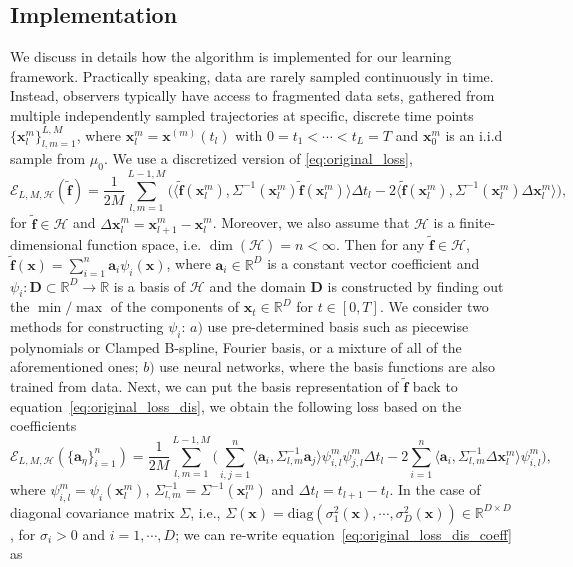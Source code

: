 \documentclass[11pt]{article} %
\def\eqref#1{equation~\ref{#1}}
\def\rvx{{\mathbf{x}}}
\def\va{{\bm{a}}}
\def\vf{{\bm{f}}}
\def\vx{{\bm{x}}}
\def\mD{{\bm{D}}}
\def\gH{{\mathcal{H}}}
\newcommand{\R}{\mathbb{R}}
\newcommand{\loss}{\mathcal{E}}
\DeclareMathOperator{\Dim}{dim}
\begin{document}
\subsection{Implementation}\label{subsec: Implementation}
%
We discuss in details how the algorithm is implemented for our learning framework. Practically speaking, data are rarely sampled continuously in time. Instead, observers typically have access to fragmented data sets, gathered from multiple independently sampled trajectories at specific, discrete time points$\{\rvx_l^m\}_{l, m = 1}^{L, M}$, where $\rvx_l^m = \rvx^{(m)}(t_l)$ with $0 = t_1 < \cdots < t_L = T$ and $\rvx_0^m$ is an i.i.d sample from $\mu_0$.  
We use a discretized version of \ref{eq:original_loss}, 
\begin{equation}\label{eq:original_loss_dis}
\loss_{L, M, \gH}(\tilde\vf) = \frac{1}{2M}\sum_{l, m = 1}^{L - 1, M}
\Big(\langle\tilde\vf(\rvx_l^m), \Sigma^{-1}(\rvx_l^m)\tilde\vf(\rvx_l^m)\rangle\Delta t_l  - 2\langle\tilde\vf(\rvx_l^m), \Sigma^{-1}(\rvx_l^m)\Delta\rvx_l^m\rangle\Big),
\end{equation}
for $\tilde\vf \in \gH$ and $\Delta\rvx_l^m = \rvx_{l + 1}^m - \rvx_l^m$.  Moreover, we also assume that $\gH$ is a finite-dimensional function space, i.e. $\Dim(\gH) = n < \infty$.  Then for any $\tilde\vf \in \gH$, $\tilde\vf(\vx) = \sum_{i = 1}^n\va_{i}\psi_{i}(\vx)$, where $\va_{i} \in \R^D$ is a constant vector coefficient and $\psi_{i}: \mD \subset \R^D \rightarrow \R$ is a basis of $\gH$ and the domain $\mD$ is constructed by finding out the $\min/\max$ of the components of $\rvx_t \in \R^D$ for $t \in [0, T]$.  We consider two methods for constructing $\psi_i$: $a)$ use pre-determined basis such as piecewise polynomials or Clamped B-spline, Fourier basis, or a mixture of all of the aforementioned ones; $b)$  use neural networks, where the basis functions are also trained from data.  Next, we can put the basis representation of $\tilde\vf$ back to \eqref{eq:original_loss_dis}, we obtain the following loss based on the coefficients
\begin{equation}\label{eq:original_loss_dis_coeff}
\loss_{L, M, \gH}(\{\va_{\eta}\}_{i = 1}^n) = \frac{1}{2M}\sum_{l, m = 1}^{L - 1, M}\Big(\sum_{i, j = 1}^n\langle\va_i, \Sigma^{-1}_{l, m}\va_j\rangle\psi^m_{i, l}\psi^m_{j, l}\Delta t_{l} - 2\sum_{i = 1}^n\langle\va_i, \Sigma^{-1}_{l, m}\Delta\rvx_l^m\rangle\psi^m_{i, l}\Big),
\end{equation}
where $\psi^m_{i, l} = \psi_i(\rvx_l^m)$, $\Sigma^{-1}_{l, m} = \Sigma^{-1}(\rvx_l^m)$ and $\Delta t_l = t_{l + 1} - t_l$. In the case of diagonal covariance matrix $\Sigma$, i.e., $\Sigma(\vx) = \text{diag}(\sigma_1^2(\vx), \cdots, \sigma_D^2(\vx)) \in \R^{D \times D}$, for $\sigma_i > 0$ and $i = 1, \cdots, D$;  we can re-write \eqref{eq:original_loss_dis_coeff}  as 
\end{document}
